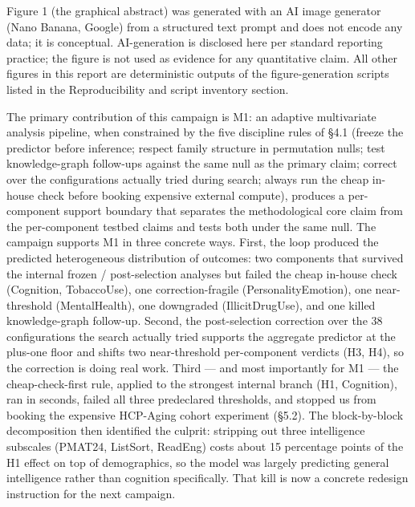 \documentclass[11pt,letterpaper]{report}
\begin{document}
Figure 1 (the graphical abstract) was generated with an AI image generator (Nano Banana, Google) from a structured text prompt and does not encode any data; it is conceptual. AI-generation is disclosed here per standard reporting practice; the figure is not used as evidence for any quantitative claim. All other figures in this report are deterministic outputs of the figure-generation scripts listed in the Reproducibility and script inventory section.



The primary contribution of this campaign is M1: an adaptive multivariate analysis pipeline, when constrained by the five discipline rules of \S4.1 (freeze the predictor before inference; respect family structure in permutation nulls; test knowledge-graph follow-ups against the same null as the primary claim; correct over the configurations actually tried during search; always run the cheap in-house check before booking expensive external compute), produces a per-component support boundary that separates the methodological core claim from the per-component testbed claims and tests both under the same null. The campaign supports M1 in three concrete ways. First, the loop produced the predicted heterogeneous distribution of outcomes: two components that survived the internal frozen / post-selection analyses but failed the cheap in-house check (Cognition, TobaccoUse), one correction-fragile (PersonalityEmotion), one near-threshold (MentalHealth), one downgraded (IllicitDrugUse), and one killed knowledge-graph follow-up. Second, the post-selection correction over the 38 configurations the search actually tried supports the aggregate predictor at the plus-one floor and shifts two near-threshold per-component verdicts (H3, H4), so the correction is doing real work. Third --- and most importantly for M1 --- the cheap-check-first rule, applied to the strongest internal branch (H1, Cognition), ran in seconds, failed all three predeclared thresholds, and stopped us from booking the expensive HCP-Aging cohort experiment (\S5.2). The block-by-block decomposition then identified the culprit: stripping out three intelligence subscales (PMAT24, ListSort, ReadEng) costs about 15 percentage points of the H1 effect on top of demographics, so the model was largely predicting general intelligence rather than cognition specifically. That kill is now a concrete redesign instruction for the next campaign.
\end{document}
